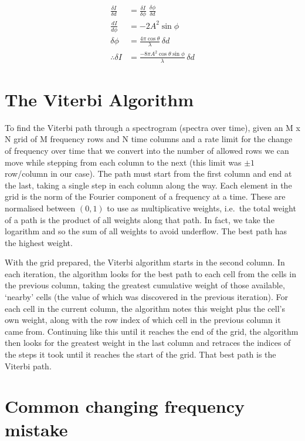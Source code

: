 \documentclass[prb,preprint]{revtex4-1}
\begin{document}
\begin{align}    
    \frac{\delta I}{\delta d} &= \frac{\delta I}{\delta \phi}\; \frac{\delta \phi}{\delta d}\\
    \frac{dI}{d\phi} &= - 2 A^2 \sin{\phi}\\
    \delta\phi &= \frac{4 \pi \cos{\theta}}{\lambda}\, \delta d\\
    \therefore \delta I &= \frac{- 8 \pi A^2 \cos{\theta} \sin{\phi}}{\lambda}\, \delta d
\end{align}

\section{The Viterbi Algorithm}
\label{app:viterbi}

To find the Viterbi path through a spectrogram (spectra over time), given an M x N grid of M frequency rows and N time columns and a rate limit for the change of frequency over time that we convert into the number of allowed rows we can move while stepping from each column to the next (this limit was $\pm 1$ row/column in our case). The path must start from the first column and end at the last, taking a single step in each column along the way. Each element in the grid is the norm of the Fourier component of a frequency at a time. These are normalised between $(0, 1)$ to use as multiplicative weights, i.e.\ the total weight of a path is the product of all weights along that path. In fact, we take the logarithm and so the sum of all weights to avoid underflow. The best path has the highest weight.


With the grid prepared, the Viterbi algorithm starts in the second column. In each iteration, the algorithm looks for the best path to each cell from the cells in the previous column, taking the greatest cumulative weight of those available, ‘nearby’ cells (the value of which was discovered in the previous iteration).
For each cell in the current column, the algorithm notes this weight plus the cell’s own weight, along with the row index of which cell in the previous column it came from.
Continuing like this until it reaches the end of the grid, the algorithm then looks for the greatest weight in the last column and retraces the indices of the steps it took until it reaches the start of the grid. That best path is the Viterbi path.


\section{Common changing frequency mistake}
\label{app:phase_gotcha}
\end{document}
